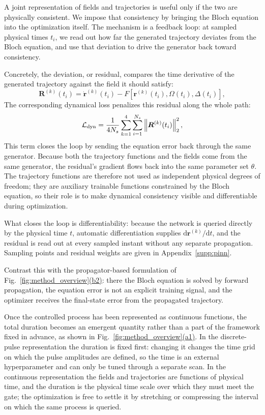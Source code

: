\documentclass[aps,prx,reprint,superscriptaddress,nofootinbib,longbibliography,floatfix,showkeys]{revtex4-2}
\newcommand{\rr}{\bm r}
\newcommand{\Ldyn}{\mathcal L_{\rm dyn}}
\newcommand{\dd}{\mathrm d}
\newcommand{\appsecref}[1]{Appendix~\hyperref[#1]{\ref*{#1}}}
\newcommand{\panref}[2]{\hyperlink{pan.#1.#2}{(#2)}}
\begin{document}
A joint representation of fields and trajectories is useful only if the two are physically consistent.  We impose that consistency by bringing the Bloch equation into the optimization itself.  The mechanism is a feedback loop: at sampled physical times $t_i$, we read out how far the generated trajectory deviates from the Bloch equation, and use that deviation to drive the generator back toward consistency.

Concretely, the deviation, or residual, compares the time derivative of the generated trajectory against the field it should satisfy:
\begin{equation}
    \bm R^{(k)}(t_i)=
    \dot{\rr}^{(k)}(t_i)
    -F[\rr^{(k)}(t_i),\Omega(t_i),\Delta(t_i)] ,
    \label{eq:dyn_residual_main}
\end{equation}
The corresponding dynamical loss penalizes this residual along the whole path:
\begin{equation}
    \Ldyn=\frac{1}{4N_s}\sum_{k=1}^{4}\sum_{i=1}^{N_s}
    \left\|\bm R^{(k)}(t_i)\right\|_2^2 ,
    \label{eq:Ldyn_main}
\end{equation}
This term closes the loop by sending the equation error back through the same generator.  Because both the trajectory functions and the fields come from the same generator, the residual's gradient flows back into the same parameter set $\theta$.  The trajectory functions are therefore not used as independent physical degrees of freedom; they are auxiliary trainable functions constrained by the Bloch equation, so their role is to make dynamical consistency visible and differentiable during optimization.

What closes the loop is differentiability: because the network is queried directly by the physical time $t$, automatic differentiation supplies $\dd\rr^{(k)}/\dd t$, and the residual is read out at every sampled instant without any separate propagation.  Sampling points and residual weights are given in \appsecref{supp:pinn}.

Contrast this with the propagator-based formulation of Fig.~\ref{fig:method_overview}\panref{fig.method_overview}{b2}: there the Bloch equation is solved by forward propagation, the equation error is not an explicit training signal, and the optimizer receives the final-state error from the propagated trajectory.

Once the controlled process has been represented as continuous functions, the total duration becomes an emergent quantity rather than a part of the framework fixed in advance, as shown in Fig.~\ref{fig:method_overview}\panref{fig.method_overview}{a1}.  In the discrete-pulse representation the duration is fixed first: changing it changes the time grid on which the pulse amplitudes are defined, so the time is an external hyperparameter and can only be tuned through a separate scan.  In the continuous representation the fields and trajectories are functions of physical time, and the duration is the physical time scale over which they must meet the gate; the optimization is free to settle it by stretching or compressing the interval on which the same process is queried.
\end{document}
